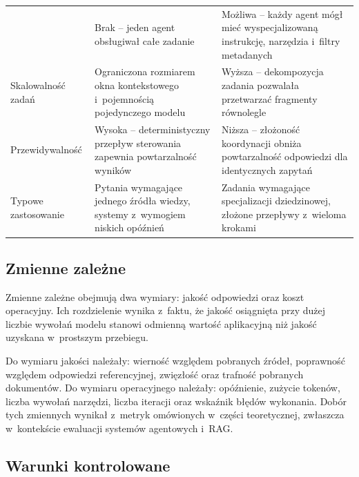 \begin{table}[H]
\begin{tabularx}{\textwidth}{@{} l L L @{}}
    & Brak -- jeden agent obsługiwał całe zadanie
    & Możliwa -- każdy agent mógł mieć wyspecjalizowaną
    instrukcję, narzędzia i~filtry
    metadanych~\cite{hong2023metagpt}                                      \\
    \addlinespace
    Skalowalność zadań
    & Ograniczona rozmiarem okna kontekstowego
    i~pojemnością pojedynczego modelu
    & Wyższa -- dekompozycja zadania pozwalała przetwarzać
    fragmenty równolegle~\cite{wu2024autogen}                              \\
    \addlinespace
    Przewidywalność
    & Wysoka -- deterministyczny przepływ sterowania zapewnia
    powtarzalność wyników
    & Niższa -- złożoność koordynacji obniża powtarzalność
    odpowiedzi dla identycznych
    zapytań~\cite{wang2024survey}                                          \\
    \addlinespace
    Typowe zastosowanie
    & Pytania wymagające jednego źródła wiedzy,
    systemy z~wymogiem niskich opóźnień
    & Zadania wymagające specjalizacji dziedzinowej,
    złożone przepływy z~wieloma krokami                                    \\
    \bottomrule
  \end{tabularx}
\end{table}

\subsection{Zmienne zależne}\label{subsec:zmienne-zalezne}

Zmienne zależne obejmują dwa wymiary: jakość odpowiedzi oraz koszt operacyjny.
Ich rozdzielenie wynika z~faktu, że jakość osiągnięta przy dużej liczbie
wywołań modelu stanowi odmienną wartość aplikacyjną niż jakość uzyskana
w~prostszym przebiegu.

Do wymiaru jakości należały: wierność względem pobranych źródeł, poprawność
względem odpowiedzi referencyjnej, zwięzłość oraz trafność pobranych
dokumentów. Do wymiaru operacyjnego należały: opóźnienie, zużycie tokenów,
liczba wywołań narzędzi, liczba iteracji oraz wskaźnik błędów wykonania. Dobór
tych zmiennych wynikał z~metryk omówionych w~części teoretycznej, zwłaszcza
w~kontekście ewaluacji systemów agentowych i~RAG.

\subsection{Warunki kontrolowane}\label{subsec:warunki-kontrolowane}

